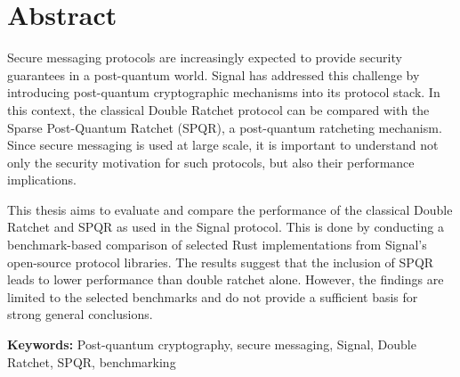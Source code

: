 \chapter*{Abstract}

Secure messaging protocols are increasingly expected to provide security guarantees in a post-quantum world. Signal has addressed this challenge by introducing post-quantum cryptographic mechanisms into its protocol stack. In this context, the classical Double Ratchet protocol can be compared with the Sparse Post-Quantum Ratchet (SPQR), a post-quantum ratcheting mechanism. Since secure messaging is used at large scale, it is important to understand not only the security motivation for such protocols, but also their performance implications. 

This thesis aims to evaluate and compare the performance of the classical Double Ratchet and SPQR as used in the Signal protocol. This is done by conducting a benchmark-based comparison of selected Rust implementations from Signal’s open-source protocol libraries. The results suggest that the inclusion of SPQR leads to lower performance than double ratchet alone. However, the findings are limited to the selected benchmarks and do not provide a sufficient basis for strong general conclusions. 

\bigskip

\noindent\textbf{Keywords:} Post-quantum cryptography, secure messaging, Signal, Double Ratchet, SPQR, benchmarking